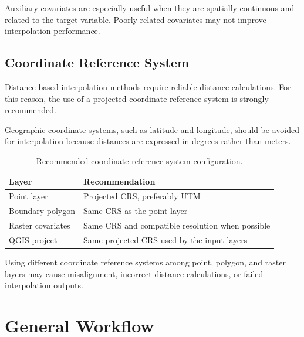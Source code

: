 \documentclass[11pt,a4paper]{article}
\begin{document}
\begin{infobox}
Auxiliary covariates are especially useful when they are spatially continuous and related to the target variable. Poorly related covariates may not improve interpolation performance.
\end{infobox}

\subsection{Coordinate Reference System}

Distance-based interpolation methods require reliable distance calculations. For this reason, the use of a projected coordinate reference system is strongly recommended.

Geographic coordinate systems, such as latitude and longitude, should be avoided for interpolation because distances are expressed in degrees rather than meters.

\begin{table}[H]
\centering
\caption{Recommended coordinate reference system configuration.}
\begin{tabular}{P{5cm} P{8cm}}
\toprule
\textbf{Layer} & \textbf{Recommendation} \\
\midrule
Point layer & Projected CRS, preferably UTM \\
Boundary polygon & Same CRS as the point layer \\
Raster covariates & Same CRS and compatible resolution when possible \\
QGIS project & Same projected CRS used by the input layers \\
\bottomrule
\end{tabular}
\end{table}

\begin{infobox}
Using different coordinate reference systems among point, polygon, and raster layers may cause misalignment, incorrect distance calculations, or failed interpolation outputs.
\end{infobox}


\section{General Workflow}
\end{document}
